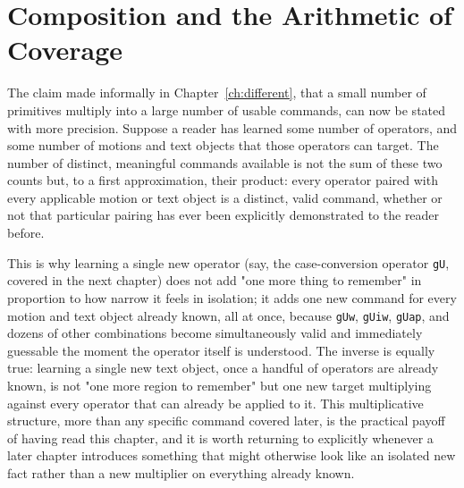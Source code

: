 \section{Composition and the Arithmetic of Coverage}
\label{sec:multiplication}

The claim made informally in Chapter~\ref{ch:different}, that a small number of primitives multiply into a large number of usable commands, can now be stated with more precision. Suppose a reader has learned some number of operators, and some number of motions and text objects that those operators can target. The number of distinct, meaningful commands available is not the sum of these two counts but, to a first approximation, their product: every operator paired with every applicable motion or text object is a distinct, valid command, whether or not that particular pairing has ever been explicitly demonstrated to the reader before.

This is why learning a single new operator (say, the case-conversion operator \texttt{gU}, covered in the next chapter) does not add "one more thing to remember" in proportion to how narrow it feels in isolation; it adds one new command for every motion and text object already known, all at once, because \texttt{gUw}, \texttt{gUiw}, \texttt{gUap}, and dozens of other combinations become simultaneously valid and immediately guessable the moment the operator itself is understood. The inverse is equally true: learning a single new text object, once a handful of operators are already known, is not "one more region to remember" but one new target multiplying against every operator that can already be applied to it. This multiplicative structure, more than any specific command covered later, is the practical payoff of having read this chapter, and it is worth returning to explicitly whenever a later chapter introduces something that might otherwise look like an isolated new fact rather than a new multiplier on everything already known.
